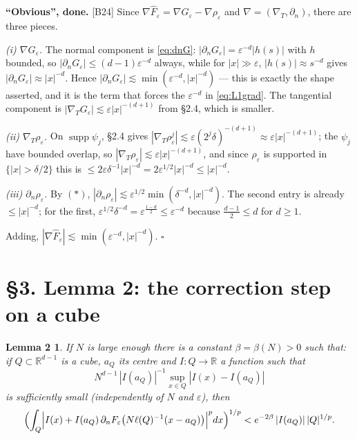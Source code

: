 \documentclass[11pt,reqno]{amsart}
\theoremstyle{plain}
\newtheorem*{lemB}{Lemma 2}
\theoremstyle{definition}
\theoremstyle{plain}
\theoremstyle{definition}
\theoremstyle{remark}
\newcommand{\Rdm}{\mathbb{R}^{d-1}}
\newcommand{\nd}{\partial_n}
\newcommand{\Ftil}{\widehat{F}_\varepsilon}
\DeclareMathOperator{\supp}{supp}
\newcommand{\Ledger}[1]{{\scriptsize\textsf{[#1]}}}
\begin{document}
\begin{expansion}
\textbf{``Obvious'', done.} \Ledger{B24} Since
$\nabla\Ftil=\nabla G_\varepsilon-\nabla\rho_\varepsilon$ and
$\nabla=(\nabla_T,\nd)$, there are three pieces.

\emph{(i) $\nabla G_\varepsilon$.} The normal component is \eqref{eq:dnG}:
$|\nd G_\varepsilon|=\varepsilon^{-d}|h(s)|$ with $h$ bounded, so
$|\nd G_\varepsilon|\le(d-1)\varepsilon^{-d}$ always, while for $|x|\gg\varepsilon$,
$|h(s)|\approx s^{-d}$ gives $|\nd G_\varepsilon|\approx|x|^{-d}$. Hence
$|\nd G_\varepsilon|\lesssim\min(\varepsilon^{-d},|x|^{-d})$ --- this is exactly the
shape asserted, and it is the term that forces the $\varepsilon^{-d}$ in
\eqref{eq:L1grad}. The tangential component is
$|\nabla_TG_\varepsilon|\lesssim\varepsilon|x|^{-(d+1)}$ from \S2.4, which is
smaller.

\emph{(ii) $\nabla_T\rho_\varepsilon$.} On $\supp\psi_j$, \S2.4 gives
$|\nabla_T\rho^j_\varepsilon|\lesssim\varepsilon(2^j\delta)^{-(d+1)}
 \approx\varepsilon|x|^{-(d+1)}$; the $\psi_j$ have bounded overlap, so
$|\nabla_T\rho_\varepsilon|\lesssim\varepsilon|x|^{-(d+1)}$, and since
$\rho_\varepsilon$ is supported in $\{|x|>\delta/2\}$ this is
$\le2\varepsilon\delta^{-1}|x|^{-d}=2\varepsilon^{1/2}|x|^{-d}\le|x|^{-d}$.

\emph{(iii) $\nd\rho_\varepsilon$.} By $(*)$,
$|\nd\rho_\varepsilon|\lesssim\varepsilon^{1/2}\min(\delta^{-d},|x|^{-d})$. The
second entry is already $\le|x|^{-d}$; for the first,
$\varepsilon^{1/2}\delta^{-d}=\varepsilon^{\frac{1-d}2}\le\varepsilon^{-d}$
because $\frac{d-1}2\le d$ for $d\ge1$.

Adding, $|\nabla\Ftil|\lesssim\min(\varepsilon^{-d},|x|^{-d})$. \hfill$\square$
\end{expansion}

\section*{\S3. Lemma 2: the correction step on a cube}

\begin{lemB}
If $N$ is large enough there is a constant $\beta=\beta(N)>0$ such that: if
$Q\subset\Rdm$ is a cube, $a_Q$ its centre and $I:Q\to\mathbb R$ a function such
that
\begin{equation}\label{eq:L2hyp}
  N^{d-1}\,|I(a_Q)|^{-1}\sup_{x\in Q}|I(x)-I(a_Q)|
\end{equation}
is sufficiently small (independently of $N$ and $\varepsilon$), then
\begin{equation}\label{eq:L2}
 \Bigl(\int_Q\Bigl|I(x)+I(a_Q)\,\nd F_\varepsilon
   \bigl(N\ell(Q)^{-1}(x-a_Q)\bigr)\Bigr|^p dx
 \Bigr)^{1/p}<e^{-2\beta}\,|I(a_Q)|\,|Q|^{1/p}.
\end{equation}
\end{lemB}
\end{document}
